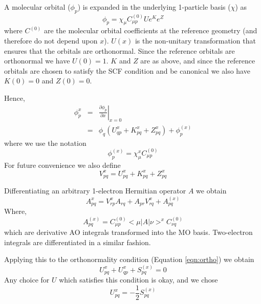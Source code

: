 \documentclass[fleqn,12pt]{article}
\newcommand{\half}{\frac{1}{2}}
\newcommand{\bra}{<\!}
\newcommand{\ket}{\!>}
\begin{document}
A molecular orbital ($\phi_p$) is expanded in the underlying
1-particle basis ($\chi$) as
\begin{equation}
  \phi_p = \chi_{\mu} C^{(0)}_{\mu p} U e^K e^Z
\end{equation}
where $C^{(0)}$ are the molecular orbital coefficients at the
reference geometry (and therefore do not depend upon $x$).  $U(x)$ is
the non-unitary transformation that ensures that the orbitals are
orthonormal. Since the reference orbitals are orthonormal we have
$U(0) = 1$.  $K$ and $Z$ are as above, and since the reference
orbitals are chosen to satisfy the SCF condition and be canonical we
also have $K(0)=0$ and $Z(0)=0$.

Hence,
\begin{eqnarray}
  \phi^x_p & = & \left. \frac{\partial \phi_p}{\partial x}
  \right|_{x=0} \\
  & = & \phi_q \left( 
    U^x_{qp} + K^x_{pq} + Z^x_{pq} \right) +
  \phi_p^{(x)}
\end{eqnarray}
where we use the notation
\begin{equation}
  \phi_p^{(x)} = \chi^x_{\mu} C^{(0)}_{\mu p}
\end{equation}
For future convenience we also define
\begin{equation}
\label{eqn:v}
   V^x_{pq} =  U^x_{pq} + K^x_{pq} + Z^x_{pq}
\end{equation}

Differentiating an arbitrary 1-electron Hermitian operator $A$ we obtain
\begin{equation}
  A^x_{pq} = V^x_{rp} A_{rq} + A_{pr} V^x_{rq} + A^{(x)}_{pq}
\end{equation}
Where, 
\begin{equation}
  A^{(x)}_{pq} = C^{(0)}_{\mu p} \bra \mu | A | \nu \ket^{x} C^{(0)}_{\nu q}
\end{equation}
which are derivative AO integrals transformed into the MO basis.
Two-electron integrals are differentiated in a similar fashion.

Applying this to the orthonormality condition (Equation
\ref{eqn:ortho}) we obtain
\begin{equation}
  U^x_{pq} + U^x_{qp} + S^{(x)}_{pq} = 0
\end{equation}
Any choice for $U$ which satisfies this condition is okay, and we
chose
\begin{equation}
  U^x_{pq} = - \half S^{(x)}_{pq} 
\end{equation}
\end{document}
